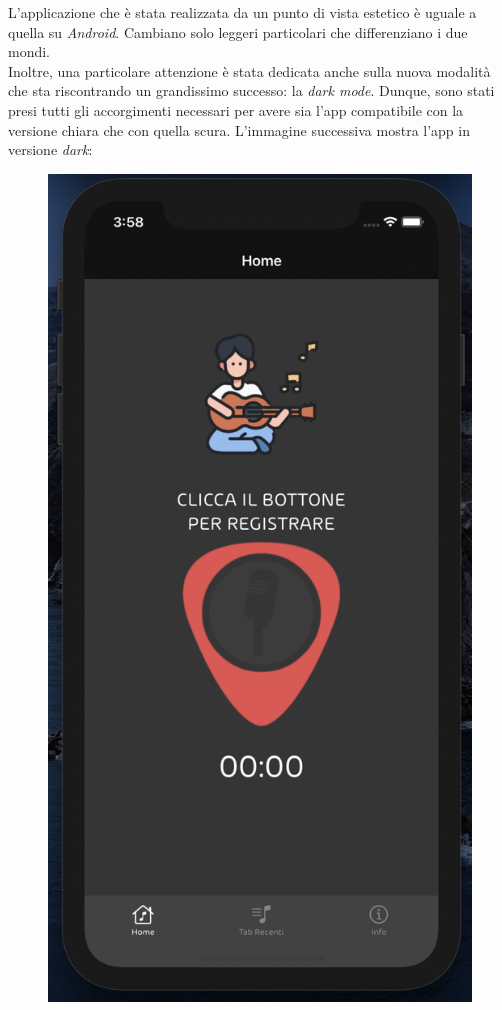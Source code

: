 \newline
L'applicazione che è stata realizzata da un punto di vista estetico è uguale a quella su \textit{Android}. Cambiano solo leggeri particolari che differenziano i due mondi.\\
\newline
Inoltre, una particolare attenzione è stata dedicata anche sulla nuova modalità che sta riscontrando un grandissimo successo: la \textit{dark mode}. Dunque, sono stati presi tutti gli accorgimenti necessari per avere sia l'app compatibile con la versione chiara che con quella scura. L'immagine successiva mostra l'app in versione \textit{dark}:
\begin{figure}[H]
	\centering
	\includegraphics[scale=0.20]{./images/img10.png}
\end{figure}

